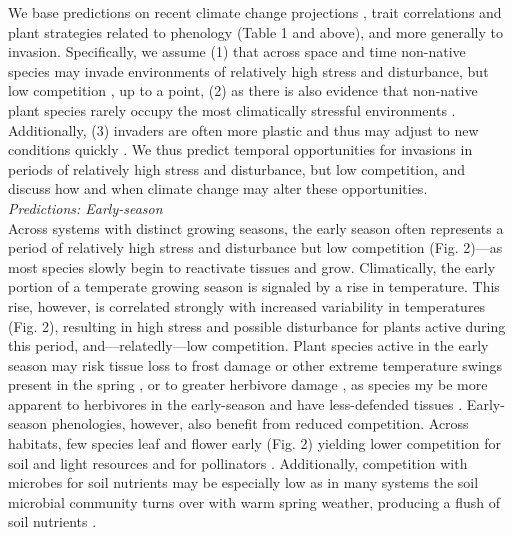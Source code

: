 \documentclass[11pt,a4paper,oneside]{article}
\begin{document}
We base predictions on recent climate change projections \citep{knutti2013}, trait correlations and plant strategies related to phenology (Table 1 and above), and more generally to invasion. Specifically, we assume (1) that across space and time non-native species may invade environments of relatively high stress and disturbance, but low competition \citep[e.g.,][]{rej1996,Gelbard2003}, up to a point, (2) as there is also evidence that non-native plant species rarely occupy the most climatically stressful environments \citep{rej1989}. Additionally, (3) invaders are often more plastic and thus may adjust to new conditions quickly \citep{funk2008,Hierro:2009up,Davidson2011,wainwright2013}. We thus predict temporal opportunities for invasions in periods of relatively high stress and disturbance, but low competition, and discuss how and when climate change may alter these opportunities. \\

\noindent \emph{Predictions: Early-season}\\
\noindent  Across systems with distinct growing seasons, the early season often represents a period of relatively high stress and disturbance but low competition (Fig. 2)---as most species slowly begin to reactivate tissues and grow. Climatically, the early portion of a temperate growing season is signaled by a rise in temperature. This rise, however, is correlated strongly with increased variability in temperatures (Fig. 2), resulting in high stress and possible disturbance for plants active during this period, and---relatedly---low competition. Plant species active in the early season may risk tissue loss to frost damage or other extreme temperature swings present in the spring \citep{Linkosalo2000,Augspurger:2009gj}, or to greater herbivore damage \citep{Lechowicz:1984cr}, as species my be more apparent to herbivores in the early-season \citep{Brody:1997ro} and have less-defended tissues \citep{vanasch2007}. Early-season phenologies, however, also benefit from reduced competition. Across habitats, few species leaf and flower early (Fig. 2) yielding lower competition for soil and light resources and for pollinators \citep{Mosquin1971}. Additionally, competition with microbes for soil nutrients may be especially low as in many systems the soil microbial community turns over with warm spring weather, producing a flush of soil nutrients \citep{Zak:1990ar}. 
\end{document}

